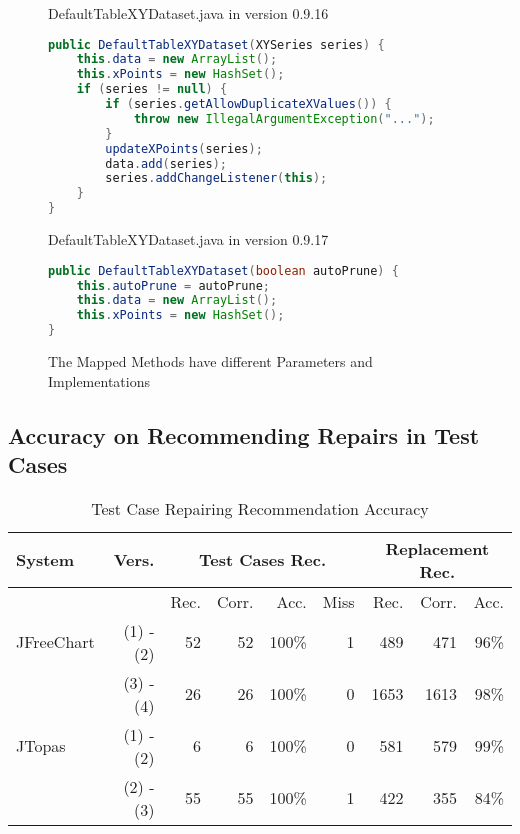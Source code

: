 
\begin{figure}[t]
DefaultTableXYDataset.java in version 0.9.16
\begin{lstlisting}[language = Java]
public DefaultTableXYDataset(XYSeries series) {
	this.data = new ArrayList();
	this.xPoints = new HashSet();
	if (series != null) {
		if (series.getAllowDuplicateXValues()) {
			throw new IllegalArgumentException("...");
		}
		updateXPoints(series);
		data.add(series);
		series.addChangeListener(this);
	}
}
\end{lstlisting}
DefaultTableXYDataset.java in version 0.9.17
\begin{lstlisting}[language = Java]
public DefaultTableXYDataset(boolean autoPrune) {
	this.autoPrune = autoPrune;
	this.data = new ArrayList();
	this.xPoints = new HashSet();
}
\end{lstlisting}
\caption{The Mapped Methods have different Parameters and Implementations}
\label{autoprun}
\end{figure}


\subsection{Accuracy on Recommending Repairs in Test Cases}

\begin{table}[t]
\small
  \centering
  \caption{Test Case Repairing Recommendation Accuracy}
  \setlength{\tabcolsep}{3pt}
	\begin{tabular}{lr|rrrr|rrr}
    \addlinespace
    \toprule
    System & Vers. & \multicolumn{4}{c|}{Test Cases Rec.} & \multicolumn{3}{c}{Replacement Rec.} \\
    \midrule
      &       & Rec.  & Corr. & Acc.  & Miss  & Rec.  & Corr. & Acc. \\
    \hline
JFreeChart & (1) - (2) & 52    & 52    & 100\% & 1     & 489   & 471   & 96\% \\
      & (3) - (4) & 26    & 26    & 100\% & 0     & 1653  & 1613  & 98\% \\
JTopas & (1) - (2) & 6     & 6     & 100\% & 0     & 581   & 579   & 99\% \\
      & (2) - (3) & 55    & 55    & 100\% & 1     & 422   & 355   & 84\% \\
\bottomrule
    \end{tabular}%
  \label{tab:recom}%
\end{table}%

